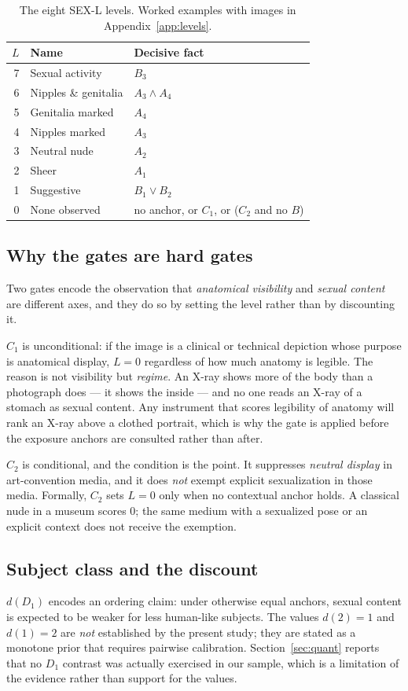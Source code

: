 \documentclass[11pt]{article}
\newcommand{\sexl}{\textsc{SEX-L}}
\begin{document}
\begin{table}[t]
\centering\small
\begin{tabularx}{\columnwidth}{@{}rlX@{}}
\toprule
$L$ & Name & Decisive fact \\
\midrule
7 & Sexual activity & $B_3$ \\
6 & Nipples \& genitalia & $A_3 \wedge A_4$ \\
5 & Genitalia marked & $A_4$ \\
4 & Nipples marked & $A_3$ \\
3 & Neutral nude & $A_2$ \\
2 & Sheer & $A_1$ \\
1 & Suggestive & $B_1 \vee B_2$ \\
0 & None observed & no anchor, or $C_1$, or ($C_2$ and no $B$) \\
\bottomrule
\end{tabularx}
\caption{The eight \sexl{} levels. Worked examples with images in Appendix~\ref{app:levels}.}
\label{tab:levels}
\end{table}

\subsection{Why the gates are hard gates}
Two gates encode the observation that \emph{anatomical visibility} and \emph{sexual content} are different axes, and they do so by setting the level rather than by discounting it.

$C_1$ is unconditional: if the image is a clinical or technical depiction whose purpose is anatomical display, $L=0$ regardless of how much anatomy is legible. The reason is not visibility but \emph{regime}. An X-ray shows more of the body than a photograph does --- it shows the inside --- and no one reads an X-ray of a stomach as sexual content. Any instrument that scores legibility of anatomy will rank an X-ray above a clothed portrait, which is why the gate is applied before the exposure anchors are consulted rather than after.

$C_2$ is conditional, and the condition is the point. It suppresses \emph{neutral display} in art-convention media, and it does \emph{not} exempt explicit sexualization in those media. Formally, $C_2$ sets $L=0$ only when no contextual anchor holds. A classical nude in a museum scores $0$; the same medium with a sexualized pose or an explicit context does not receive the exemption.

\subsection{Subject class and the discount}
$d(D_1)$ encodes an ordering claim: under otherwise equal anchors, sexual content is expected to be weaker for less human-like subjects. The values $d(2)=1$ and $d(1)=2$ are \emph{not} established by the present study; they are stated as a monotone prior that requires pairwise calibration. Section~\ref{sec:quant} reports that no $D_1$ contrast was actually exercised in our sample, which is a limitation of the evidence rather than support for the values.
\end{document}
